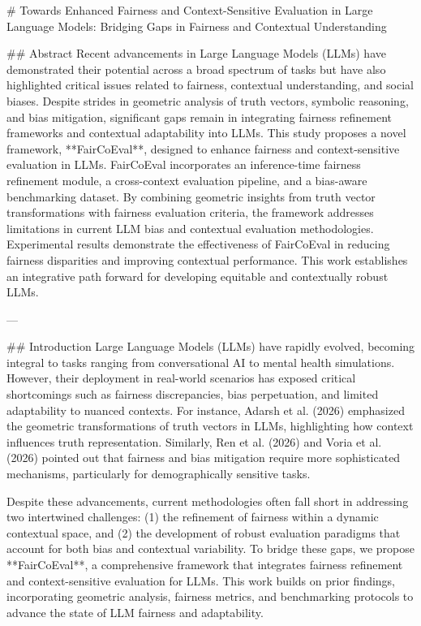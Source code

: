 # Towards Enhanced Fairness and Context-Sensitive Evaluation in Large Language Models: Bridging Gaps in Fairness and Contextual Understanding

## Abstract
Recent advancements in Large Language Models (LLMs) have demonstrated their potential across a broad spectrum of tasks but have also highlighted critical issues related to fairness, contextual understanding, and social biases. Despite strides in geometric analysis of truth vectors, symbolic reasoning, and bias mitigation, significant gaps remain in integrating fairness refinement frameworks and contextual adaptability into LLMs. This study proposes a novel framework, **FairCoEval**, designed to enhance fairness and context-sensitive evaluation in LLMs. FairCoEval incorporates an inference-time fairness refinement module, a cross-context evaluation pipeline, and a bias-aware benchmarking dataset. By combining geometric insights from truth vector transformations with fairness evaluation criteria, the framework addresses limitations in current LLM bias and contextual evaluation methodologies. Experimental results demonstrate the effectiveness of FairCoEval in reducing fairness disparities and improving contextual performance. This work establishes an integrative path forward for developing equitable and contextually robust LLMs.

---

## Introduction
Large Language Models (LLMs) have rapidly evolved, becoming integral to tasks ranging from conversational AI to mental health simulations. However, their deployment in real-world scenarios has exposed critical shortcomings such as fairness discrepancies, bias perpetuation, and limited adaptability to nuanced contexts. For instance, Adarsh et al. (2026) emphasized the geometric transformations of truth vectors in LLMs, highlighting how context influences truth representation. Similarly, Ren et al. (2026) and Voria et al. (2026) pointed out that fairness and bias mitigation require more sophisticated mechanisms, particularly for demographically sensitive tasks.

Despite these advancements, current methodologies often fall short in addressing two intertwined challenges: (1) the refinement of fairness within a dynamic contextual space, and (2) the development of robust evaluation paradigms that account for both bias and contextual variability. To bridge these gaps, we propose **FairCoEval**, a comprehensive framework that integrates fairness refinement and context-sensitive evaluation for LLMs. This work builds on prior findings, incorporating geometric analysis, fairness metrics, and benchmarking protocols to advance the state of LLM fairness and adaptability.


